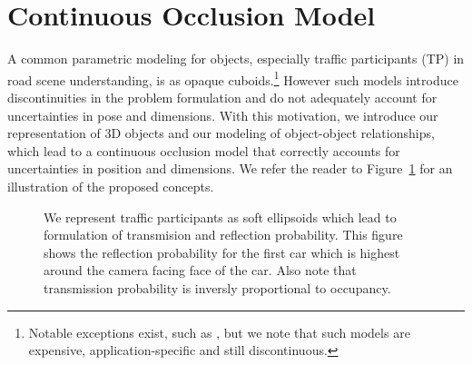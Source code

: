 \section{Continuous Occlusion Model}
\label{sec:setup}



\def\TP{TP}
A common parametric modeling for objects, especially traffic participants (TP) in road scene understanding, is as opaque cuboids.\footnote{Notable exceptions exist, such as \cite{Zia_etal_2014}, but we note that such models are expensive, application-specific and still discontinuous.} However such models introduce discontinuities in the problem formulation and do not adequately account for uncertainties in pose and dimensions. With this motivation, we introduce our representation of 3D objects and our modeling of object-object relationships, which lead to a continuous occlusion model that correctly accounts for uncertainties in position and dimensions. We refer the reader to Figure~\ref{fig:reflectiontransimission} for an illustration of the proposed concepts.


\begin{figure}
  \usetikzlibrary{calc}
  \centering
  \begin{tikzpicture}
    
  \end{tikzpicture}
  \vspace{-0.3cm}
  \caption{\small We represent traffic participants as soft ellipsoids which lead to formulation of transmision and reflection probability. This figure shows the reflection probability for the first car which is highest around the camera facing face of the car. Also note that transmission probability is inversly proportional to occupancy.}
  \label{fig:reflectiontransimission}
  \vspace{-0.3cm}
\end{figure}

